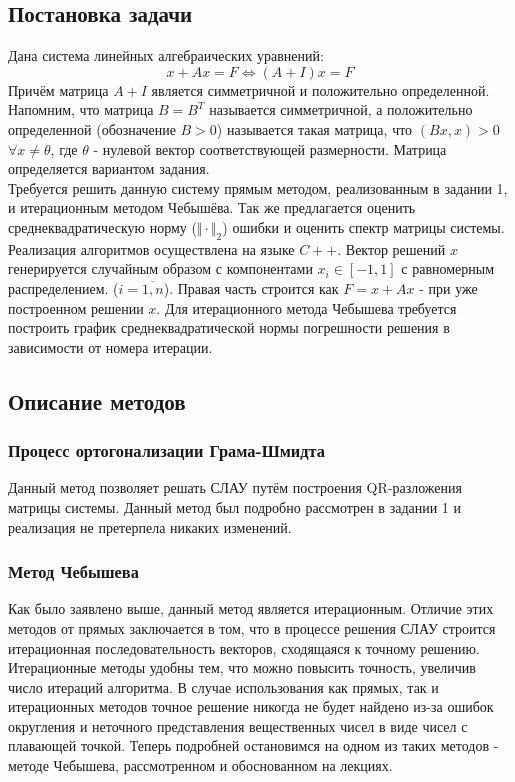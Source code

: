 \documentclass[a4paper,12pt,titlepage,final]{article}
\begin{document}
\subsection{Постановка задачи}
Дана система линейных алгебраических уравнений:
$$x + Ax = F \Leftrightarrow (A + I)x = F$$
Причём матрица $A + I$ является симметричной и положительно определенной. Напомним, что матрица $B = B^T$ называется симметричной, а положительно определенной (обозначение $B > 0$) называется такая матрица, что $(Bx, x) > 0$ $\forall x \neq \theta$, где $\theta$ - нулевой вектор соответствующей размерности. Матрица определяется вариантом задания. \\
Требуется решить данную систему прямым методом, реализованным в задании 1, и итерационным методом Чебышёва. Так же предлагается оценить среднеквадратическую норму ($\Vert \cdot \Vert_2$) ошибки и оценить спектр матрицы системы. Реализация алгоритмов осуществлена на языке $C++$. Вектор решений $x$ генерируется случайным образом с компонентами $x_i \in [-1, 1]$ с равномерным распределением. ($i = \overline{1, n}$). Правая часть строится как $F = x + Ax$ - при уже построенном решении $x$. Для итерационного метода Чебышева требуется построить график среднеквадратической нормы погрешности решения в зависимости от номера итерации.
\subsection{Описание методов}
\subsubsection{Процесс ортогонализации Грама-Шмидта}
Данный метод позволяет решать СЛАУ путём построения QR-разложения матрицы системы. Данный метод был подробно рассмотрен в задании 1 и реализация не претерпела никаких изменений.
\subsubsection{Метод Чебышева}
Как было заявлено выше, данный метод является итерационным. Отличие этих методов от прямых заключается в том, что в процессе решения СЛАУ строится итерационная последовательность векторов, сходящаяся к точному решению. Итерационные методы удобны тем, что можно повысить точность, увеличив число итераций алгоритма. В случае использования как прямых, так и итерационных методов точное решение никогда не будет найдено из-за ошибок округления и неточного представления вещественных чисел в виде чисел с плавающей точкой. Теперь подробней остановимся на одном из таких методов - методе Чебышева, рассмотренном и обоснованном на лекциях.
\end{document}
